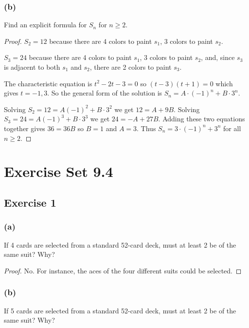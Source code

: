 \documentclass[14pt]{extarticle}
\begin{document}
\subsubsection{(b)}
Find an explicit formula for \(S_n\) for \(n \geq 2\).

\begin{proof}
\(S_2 = 12\) because there are 4 colors to paint \(s_1\), 3 colors to paint \(s_2\).

\(S_3 = 24\) because there are 4 colors to paint \(s_1\), 3 colors to paint \(s_2\), and, since \(s_3\) is adjacent to 
both \(s_1\) and \(s_2\), there are 2 colors to paint \(s_3\).

The characteristic equation is \(t^2 - 2t - 3 = 0\) so \((t-3)(t+1) = 0\) which gives \(t = -1, 3\). So the general
form of the solution is \(S_n = A \cdot (-1)^n + B \cdot 3^n\).

Solving \(S_2 = 12 = A(-1)^2 + B \cdot 3^2\) we get \(12 = A + 9B\). Solving \(S_3 = 24 = A(-1)^3 + B \cdot 3^3\) we get 
\(24 = -A + 27B\). Adding these two equations together gives \(36 = 36B\) so \(B = 1\) and \(A = 3\). 
Thus \(S_n = 3\cdot(-1)^n + 3^n\) for all \(n \geq 2\).
\end{proof}

\section{Exercise Set 9.4}

\subsection{Exercise 1}
\subsubsection{(a)}
If 4 cards are selected from a standard 52-card deck, must at least 2 be of the same suit? Why?

\begin{proof}
No. For instance, the aces of the four different suits could be selected.
\end{proof}

\subsubsection{(b)}
If 5 cards are selected from a standard 52-card deck, must at least 2 be of the same suit? Why?
\end{document}
